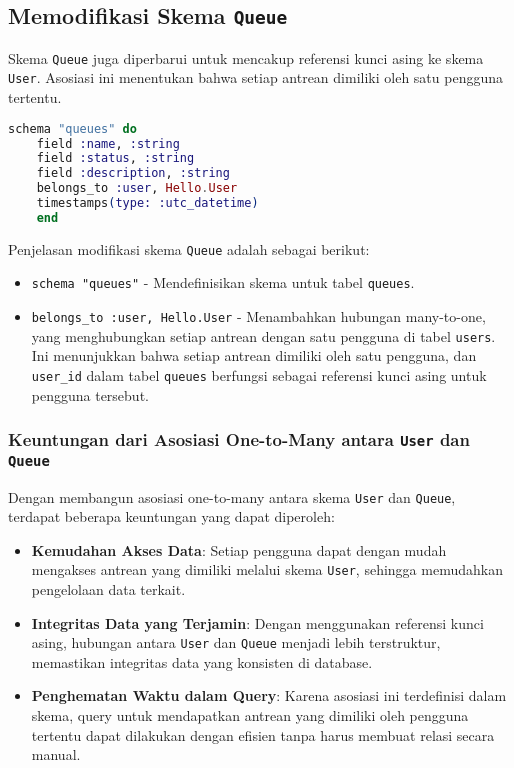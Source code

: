 \subsection{Memodifikasi Skema \texttt{Queue}}
Skema \texttt{Queue} juga diperbarui untuk mencakup referensi kunci asing ke skema \texttt{User}. Asosiasi ini menentukan bahwa setiap antrean dimiliki oleh satu pengguna tertentu.

\begin{lstlisting}[language=Elixir, caption={\texttt{lib/hello/queue.ex}}]
	schema "queues" do
	field :name, :string
	field :status, :string
	field :description, :string
	belongs_to :user, Hello.User
	timestamps(type: :utc_datetime)
	end
\end{lstlisting}

Penjelasan modifikasi skema \texttt{Queue} adalah sebagai berikut:
\begin{itemize}
	\item \texttt{schema "queues"} - Mendefinisikan skema untuk tabel \texttt{queues}.
	\item \texttt{belongs\_to :user, Hello.User} - Menambahkan hubungan many-to-one, yang menghubungkan setiap antrean dengan satu pengguna di tabel \texttt{users}. Ini menunjukkan bahwa setiap antrean dimiliki oleh satu pengguna, dan \texttt{user\_id} dalam tabel \texttt{queues} berfungsi sebagai referensi kunci asing untuk pengguna tersebut.
\end{itemize}

\subsubsection{Keuntungan dari Asosiasi One-to-Many antara \texttt{User} dan \texttt{Queue}}
Dengan membangun asosiasi one-to-many antara skema \texttt{User} dan \texttt{Queue}, terdapat beberapa keuntungan yang dapat diperoleh:
\begin{itemize}
	\item \textbf{Kemudahan Akses Data}: Setiap pengguna dapat dengan mudah mengakses antrean yang dimiliki melalui skema \texttt{User}, sehingga memudahkan pengelolaan data terkait.
	\item \textbf{Integritas Data yang Terjamin}: Dengan menggunakan referensi kunci asing, hubungan antara \texttt{User} dan \texttt{Queue} menjadi lebih terstruktur, memastikan integritas data yang konsisten di database.
	\item \textbf{Penghematan Waktu dalam Query}: Karena asosiasi ini terdefinisi dalam skema, query untuk mendapatkan antrean yang dimiliki oleh pengguna tertentu dapat dilakukan dengan efisien tanpa harus membuat relasi secara manual.
\end{itemize}

